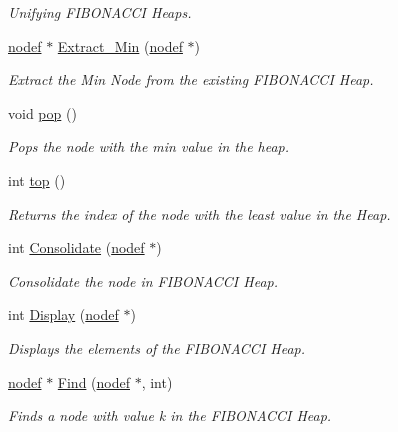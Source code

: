 \begin{DoxyCompactItemize}
\begin{DoxyCompactList}\small\item\em Unifying F\+I\+B\+O\+N\+A\+C\+CI Heaps. \end{DoxyCompactList}\item 
\hyperlink{structnodef}{nodef} $\ast$ \hyperlink{classFibonacciHeap_a532230bf1688291111504c863d35cb08}{Extract\+\_\+\+Min} (\hyperlink{structnodef}{nodef} $\ast$)
\begin{DoxyCompactList}\small\item\em Extract the Min Node from the existing F\+I\+B\+O\+N\+A\+C\+CI Heap. \end{DoxyCompactList}\item 
void \hyperlink{classFibonacciHeap_a142cff5b1af93a67cd2aad28b5b1ff4e}{pop} ()
\begin{DoxyCompactList}\small\item\em Pops the node with the min value in the heap. \end{DoxyCompactList}\item 
int \hyperlink{classFibonacciHeap_a21a62f4d430667d9ffba329e7d2d013f}{top} ()
\begin{DoxyCompactList}\small\item\em Returns the index of the node with the least value in the Heap. \end{DoxyCompactList}\item 
int \hyperlink{classFibonacciHeap_ab9d2359569f454390af246409a48a6a3}{Consolidate} (\hyperlink{structnodef}{nodef} $\ast$)
\begin{DoxyCompactList}\small\item\em Consolidate the node in F\+I\+B\+O\+N\+A\+C\+CI Heap. \end{DoxyCompactList}\item 
int \hyperlink{classFibonacciHeap_ac457628267008b428d6b0105496dba45}{Display} (\hyperlink{structnodef}{nodef} $\ast$)
\begin{DoxyCompactList}\small\item\em Displays the elements of the F\+I\+B\+O\+N\+A\+C\+CI Heap. \end{DoxyCompactList}\item 
\hyperlink{structnodef}{nodef} $\ast$ \hyperlink{classFibonacciHeap_adbfcc840c7537cdeb0ba9a9ec0b68888}{Find} (\hyperlink{structnodef}{nodef} $\ast$, int)
\begin{DoxyCompactList}\small\item\em Finds a node with value k in the F\+I\+B\+O\+N\+A\+C\+CI Heap. \end{DoxyCompactList}\item 

\end{DoxyCompactItemize}
